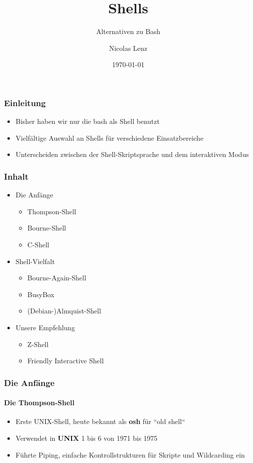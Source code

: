 \documentclass[12pt,utf8]{beamer}
\title{Shells}
\subtitle{Alternativen zu Bash}
\author[Free and Open Source Software AG]{Nicolas Lenz}
\institute[FOSS AG]{Free and Open Source Software AG\\Fakultät für Informatik}
\date{\today}
\begin{document}
	\titlepage
	
	\begin{frame}
	\frametitle{Einleitung}
	\begin{itemize}
		\item Bisher haben wir nur die bash als Shell benutzt
		\item Vielfältige Auswahl an Shells für verschiedene Einsatzbereiche
		\item Unterscheiden zwischen der Shell-Skriptsprache und dem interaktiven Modus
	\end{itemize}
	\end{frame}

	\begin{frame}
	\frametitle{Inhalt}
	\begin{itemize}
		\item Die Anfänge
		\begin{itemize}
			\item Thompson-Shell
			\item Bourne-Shell
			\item C-Shell
		\end{itemize}
		\pause
		\item Shell-Vielfalt
		\begin{itemize}
			\item Bourne-Again-Shell
			\item BusyBox
			\item (Debian-)Almquist-Shell
		\end{itemize}
		\pause
		\item Unsere Empfehlung
		\begin{itemize}
			\item Z-Shell
			\item Friendly Interactive Shell
		\end{itemize}
	\end{itemize}
	\end{frame}

	\begin{frame}
	\frametitle{Die Anfänge}
	\framesubtitle{Die Thompson-Shell}
	\begin{itemize}
		\item Erste UNIX-Shell, heute bekannt als \textbf{osh} für ``old shell``
		\item Verwendet in \textbf{UNIX} 1 bis 6 von 1971 bis 1975
		\item Führte Piping, einfache Kontrollstrukturen für Skripte und Wildcarding ein
	\end{itemize}
	\end{frame}
\end{document}
